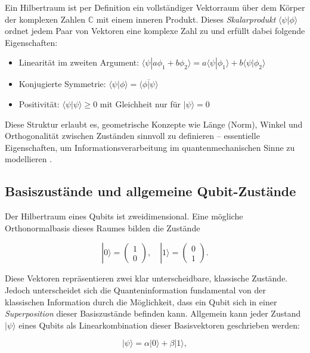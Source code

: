 Ein Hilbertraum ist per Definition ein vollständiger Vektorraum über dem Körper der komplexen Zahlen $\mathbb{C}$ mit einem inneren Produkt. Dieses \textit{Skalarprodukt} $\langle \psi | \phi \rangle$ ordnet jedem Paar von Vektoren eine komplexe Zahl zu und erfüllt dabei folgende Eigenschaften:

\begin{itemize}
    \item Linearität im zweiten Argument: $\langle \psi | a \phi_1 + b \phi_2 \rangle = a \langle \psi | \phi_1 \rangle + b \langle \psi | \phi_2 \rangle$
    \item Konjugierte Symmetrie: $\langle \psi | \phi \rangle = \overline{\langle \phi | \psi \rangle}$
    \item Positivität: $\langle \psi | \psi \rangle \geq 0$ mit Gleichheit nur für $|\psi\rangle = 0$
\end{itemize}

Diese Struktur erlaubt es, geometrische Konzepte wie Länge (Norm), Winkel und Orthogonalität zwischen Zuständen sinnvoll zu definieren – essentielle Eigenschaften, um Informationsverarbeitung im quantenmechanischen Sinne zu modellieren \cite{nielsen2002quantum}.

\subsection*{Basiszustände und allgemeine Qubit-Zustände}
Der Hilbertraum eines Qubits ist zweidimensional. Eine mögliche Orthonormalbasis dieses Raumes bilden die Zustände

\begin{equation}
|0\rangle = \begin{pmatrix} 1 \\ 0 \end{pmatrix}, \quad |1\rangle = \begin{pmatrix} 0 \\ 1 \end{pmatrix}.
\end{equation}

Diese Vektoren repräsentieren zwei klar unterscheidbare, klassische Zustände. Jedoch unterscheidet sich die Quanteninformation fundamental von der klassischen Information durch die Möglichkeit, dass ein Qubit sich in einer \textit{Superposition} dieser Basiszustände befinden kann. Allgemein kann jeder Zustand $|\psi\rangle$ eines Qubits als Linearkombination dieser Basisvektoren geschrieben werden:

\begin{equation}
|\psi\rangle = \alpha |0\rangle + \beta |1\rangle,
\end{equation}

